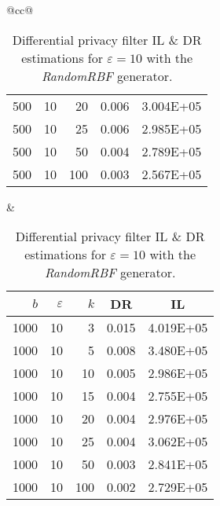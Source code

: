 \begin{table}[H]
\begin{tabular}{@{}cc@{}}
\begin{tabular}{@{}rrrrr@{}}
			500 & 10 & 20  & 0.006 & 3.004E+05 \\
			500 & 10 & 25  & 0.006 & 2.985E+05 \\
			500 & 10 & 50  & 0.004 & 2.789E+05 \\
			500 & 10 & 100 & 0.003 & 2.567E+05 \\ \bottomrule
		\end{tabular}
		&
		\begin{tabular}{@{}rrrrr@{}}
			\toprule
			$b$ & $\varepsilon$ & $k$ & \multicolumn{1}{c}{DR} & \multicolumn{1}{c}{IL} \\ \midrule
			1000 & 10 & 3   & 0.015 & 4.019E+05 \\
			1000 & 10 & 5   & 0.008 & 3.480E+05 \\
			1000 & 10 & 10  & 0.005 & 2.986E+05 \\
			1000 & 10 & 15  & 0.004 & 2.755E+05 \\
			1000 & 10 & 20  & 0.004 & 2.976E+05 \\
			1000 & 10 & 25  & 0.004 & 3.062E+05 \\
			1000 & 10 & 50  & 0.003 & 2.841E+05 \\
			1000 & 10 & 100 & 0.002 & 2.729E+05 \\ \bottomrule
		\end{tabular}
	\end{tabular}
	\caption[Differential privacy filter DR \& IL estimations (RandomRBF), $\varepsilon = 10$.]{Differential privacy filter IL \& DR estimations for $\varepsilon = 10$ with the \textit{RandomRBF} generator.}
	\label{table:results-rbf-diff-priv-e10}
\end{table}

